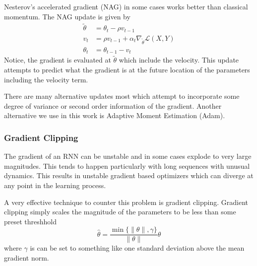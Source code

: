 Nesterov's accelerated gradient (NAG) in some cases works better than classical
momentum. The NAG update is given by 
\begin{align*}
    \tilde{\theta} &= \theta_t - \rho v_{t-1} \\
    v_t &= \rho v_{t-1} + \alpha_t \nabla_{\tilde{\theta}} \mathcal{L}(X, Y) \\
    \theta_t &= \theta_{t-1} - v_t 
\end{align*}
Notice, the gradient is evaluated at $\tilde{\theta}$ which include the
velocity. This update attempts to predict what the gradient is at the future
location of the parameters including the velocity term.

There are many alternative updates most which attempt to incorporate some
degree of variance or second order information of the gradient. Another
alternative we use in this work is Adaptive Moment Estimation
(Adam)\cite{kingma2014adam}.

\subsubsection{Gradient Clipping}

The gradient of an RNN can be unstable and in some cases explode to very large
magnitudes. This tends to happen particularly with long sequences with unusual
dynamics. This results in unstable gradient based optimizers which can diverge
at any point in the learning process. 

A very effective technique to counter this problem is gradient clipping.
Gradient clipping simply scales the magnitude of the parameters to be less than
some preset threshhold
\[
\hat{\theta} = \frac{\min\{\|\theta\|, \gamma\}}{\|\theta\|} \theta
\]
where $\gamma$ is can be set to something like one standard deviation above the
mean gradient norm.
